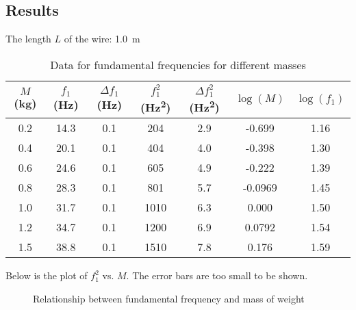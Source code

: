 \documentclass[11pt]{article}
\begin{document}
    \subsection*{Results}
        The length $L$ of the wire: \SI{1.0}{\meter}
        \begin{table}[H]
            \centering
            \caption{Data for fundamental frequencies for different masses}
            \begin{tabular}{c c c c c c c}
                \toprule
                $M$ (\si{\kilogram}) & $f_1$ (\si{\hertz}) & $\Delta f_1$ (\si{\hertz}) & $f_1^2$ (\si{\hertz\squared}) & $\Delta f_1^2$ (\si{\hertz\squared}) & $\log(M)$ & $\log(f_1)$ \\
                \midrule
                0.2 & 14.3 & 0.1 & 204 & 2.9 & -0.699 & 1.16 \\
                0.4 & 20.1 & 0.1 & 404 & 4.0 & -0.398 & 1.30 \\
                0.6 & 24.6 & 0.1 & 605 & 4.9 & -0.222 & 1.39 \\
                0.8 & 28.3 & 0.1 & 801 & 5.7 & -0.0969 & 1.45 \\
                1.0 & 31.7 & 0.1 & 1010 & 6.3 & 0.000 & 1.50 \\
                1.2 & 34.7 & 0.1 & 1200 & 6.9 & 0.0792 & 1.54 \\
                1.5 & 38.8 & 0.1 & 1510 & 7.8 & 0.176 & 1.59 \\
                \bottomrule
            \end{tabular}
        \end{table}
        Below is the plot of $f_1^2$ vs. $M$. The error bars are too small to be shown.
        \begin{figure}[H]
            \centering
            \caption{Relationship between fundamental frequency and mass of weight}
        \end{figure}
\end{document}
